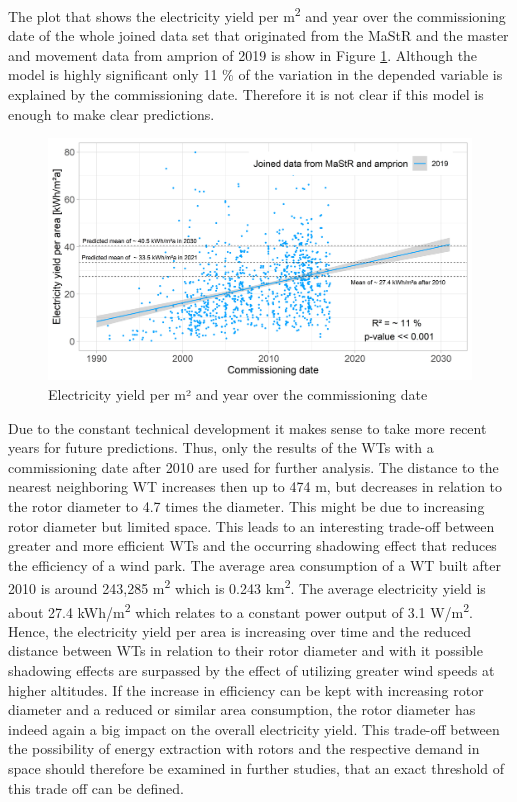 \documentclass[a4paper,11pt]{article}
\begin{document}
The plot that shows the electricity yield per m\textsuperscript{2} and year over the commissioning date of the whole joined data set that originated from the MaStR and the master and movement data from amprion of 2019 is show in Figure \ref{fig:eyarea}. Although the model is highly significant only 11 \% of the variation in the depended variable is explained by the commissioning date. Therefore it is not clear if this model is enough to make clear predictions.
\begin{figure}

{\centering \includegraphics[width=1\linewidth]{data/MaStR_amprion_analysis/results_of_analysis/e_yield_per_m2_over_commissioning_date} 

}

\caption{Electricity yield per m² and year over the commissioning date}\label{fig:eyarea}
\end{figure}
Due to the constant technical development it makes sense to take more recent years for future predictions. Thus, only the results of the WTs with a commissioning date after 2010 are used for further analysis. The distance to the nearest neighboring WT increases then up to 474 m, but decreases in relation to the rotor diameter to 4.7 times the diameter. This might be due to increasing rotor diameter but limited space. This leads to an interesting trade-off between greater and more efficient WTs and the occurring shadowing effect that reduces the efficiency of a wind park. The average area consumption of a WT built after 2010 is around 243,285 m\textsuperscript{2} which is 0.243 km\textsuperscript{2}. The average electricity yield is about 27.4 kWh/m\textsuperscript{2} which relates to a constant power output of 3.1 W/m\textsuperscript{2}. Hence, the electricity yield per area is increasing over time and the reduced distance between WTs in relation to their rotor diameter and with it possible shadowing effects are surpassed by the effect of utilizing greater wind speeds at higher altitudes. If the increase in efficiency can be kept with increasing rotor diameter and a reduced or similar area consumption, the rotor diameter has indeed again a big impact on the overall electricity yield. This trade-off between the possibility of energy extraction with rotors and the respective demand in space should therefore be examined in further studies, that an exact threshold of this trade off can be defined.
\end{document}

